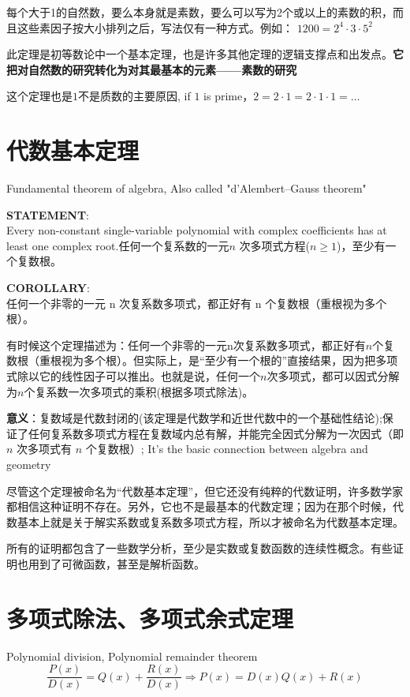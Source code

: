 \documentclass[../main.tex]{subfiles}
\begin{document}
每个大于1的自然数，要么本身就是素数，要么可以写为2个或以上的素数的积，而且这些素因子按大小排列之后，写法仅有一种方式。例如： $ 1200 = 2^4\cdot 3 \cdot 5^2$

此定理是初等数论中一个基本定理，也是许多其他定理的逻辑支撑点和出发点。\textbf{它把对自然数的研究转化为对其最基本的元素——素数的研究}

这个定理也是$1$不是质数的主要原因, if $1$ is prime，$2=2\cdot 1=2\cdot 1\cdot 1=\ldots $

\section{代数基本定理}
Fundamental theorem of algebra, Also called "d'Alembert–Gauss theorem"
\begin{mdframed}
  \textbf{STATEMENT}:\\
  Every non-constant single-variable polynomial with complex coefficients has at least one complex root.任何一个复系数的一元$n$ 次多项式方程($n\geq 1$)，至少有一个复数根。﻿
\end{mdframed}
\begin{mdframed}
  \textbf{COROLLARY}:\\
  任何一个非零的一元 n 次复系数多项式，都正好有 n 个复数根（重根视为多个根）。
\end{mdframed}

有时候这个定理描述为：任何一个非零的一元n次复系数多项式，都正好有$n$个复数根（重根视为多个根）。但实际上，是“至少有一个根的”直接结果，因为把多项式除以它的线性因子可以推出。也就是说，任何一个$n$次多项式，都可以因式分解为$n$个复系数一次多项式的乘积(根据多项式除法)。

\textbf{意义}：复数域是代数封闭的(该定理是代数学和近世代数中的一个基础性结论);保证了任何复系数多项式方程在复数域内总有解，并能完全因式分解为一次因式（即 \(n\) 次多项式有 \(n\) 个复数根）; It's the basic connection between algebra and geometry

尽管这个定理被命名为“代数基本定理”，但它还没有纯粹的代数证明，许多数学家都相信这种证明不存在。另外，它也不是最基本的代数定理；因为在那个时候，代数基本上就是关于解实系数或复系数多项式方程，所以才被命名为代数基本定理。

所有的证明都包含了一些数学分析，至少是实数或复数函数的连续性概念。有些证明也用到了可微函数，甚至是解析函数。

\section{多项式除法、多项式余式定理}
Polynomial division, Polynomial remainder theorem
\[ \frac{P(x)}{D(x)} = Q(x)+\frac{R(x)}{D(x)} \Rightarrow P(x)=D(x)Q(x)+R(x) \]
\end{document}
